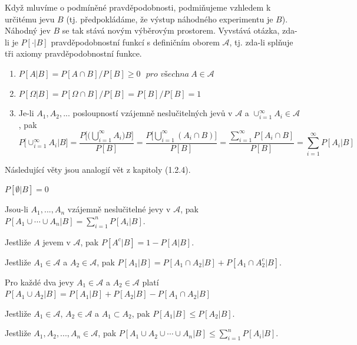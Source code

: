 Když mluvíme o podmíněné pravděpodobnosti, podmiňujeme vzhledem k určitému jevu $B$ (tj. předpokládáme, že výstup náhodného experimentu je $B$). Náhodný jev $B$ se tak stává novým výběrovým prostorem. Vyvstává otázka, zda-li je $P[\cdot | B]$ pravděpodobnostní funkcí s definičním oborem $\mathscr{A}$, tj. zda-li splňuje tři axiomy pravděpodobnostní funkce.
\begin{enumerate}
\item $P[A|B] = P[A \cap B] / P[B] \ge 0 ~~~\textit{pro všechna}~A \in \mathscr{A}$
\item $P[\Omega|B] = P[\Omega \cap B] / P[B] = P[B] / P[B] = 1$
\item Je-li $A_1, A_2, ...$ posloupností vzájemně neslučitelných jevů v $\mathscr{A}$ a $\cup_{i=1}^{\infty}A_i \in \mathscr{A}$, pak
\begin{equation*}
P\Big[ \cup_{i=1}^{\infty}A_i|B\Big] = \frac{P\Big[ \Big(\bigcup_{i=1}^{\infty}A_i \Big)B\Big]}{P[B]} = \frac{P \Big[ \bigcup_{i=1}^{\infty}(A_i \cap B)\Big]}{P[B]} = \frac{\sum_{i=1}^{\infty}P[A_i \cap B]}{P[B]} = \sum_{i=1}^{\infty}P[A_i|B]
\end{equation*}
\end{enumerate}
Následující věty jsou analogií vět z kapitoly (1.2.4).
\begin{theorem}
$P[\emptyset | B] = 0$
\end{theorem}
\begin{theorem}
Jsou-li $A_1, ..., A_n$ vzájemně neslučitelné jevy v $\mathscr{A}$, pak $P[A_1 \cup \cdots \cup A_n | B] = \sum_{i=1}^nP[A_i|B]$.
\end{theorem}
\begin{theorem}
Jestliže $A$ jevem v $\mathscr{A}$, pak $P[A^c|B] = 1 - P[A|B]$.
\end{theorem}
\begin{theorem}
Jestliže $A_1 \in \mathscr{A}$ a $A_2 \in \mathscr{A}$, pak $P[A_1|B] = P[A_1 \cap A_2|B] + P[A_1 \cap A_2^c|B]$.
\end{theorem}
\begin{theorem}
Pro každé dva jevy $A_1 \in \mathscr{A}$ a $A_2 \in \mathscr{A}$ platí $P[A_1 \cup A_2|B] = P[A_1|B] + P[A_2|B] - P[A_1 \cap A_2|B]$
\end{theorem}
\begin{theorem}
Jestliže $A_1 \in \mathscr{A}$, $A_2 \in \mathscr{A}$ a $A_1 \subset A_2$, pak $P[A_1|B] \le P[A_2|B]$.
\end{theorem}
\begin{theorem}
Jestliže $A_1, A_2, ..., A_n \in \mathscr{A}$, pak $P[A_1 \cup A_2 \cup \cdots \cup A_n | B] \le \sum_{i=1}^n P[A_i|B]$.
\end{theorem}
